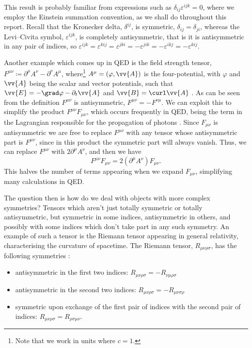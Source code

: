 \documentclass[fleqn]{NotesClass}
\begin{document}
    This result is probably familiar from expressions such as \(\delta_{ij}\varepsilon^{ijk} = 0\), where we employ the Einstein summation convention, as we shall do throughout this report.
    Recall that the Kronecker delta, \(\delta^{ij}\), is symmetric, \(\delta_{ij} = \delta_{ji}\), whereas the Levi--Civita symbol, \(\varepsilon^{ijk}\), is completely antisymmetric, that is it is antisymmetric in any pair of indices, so \(\varepsilon^{ijk} = \varepsilon^{kij} = \varepsilon^{jki} = -\varepsilon^{jik} = -\varepsilon^{ikj} = -\varepsilon^{kij}\).
    
    Another example which comes up in QED is the field strength tensor, \(F^{\mu\nu} \coloneqq \partial^\mu A^\nu - \partial^\nu A^\mu\), where\footnote{Note that we work in units where \(c = 1\).} \(A^\mu = (\varphi, \vv{A})\) is the four-potential, with \(\varphi\) and \(\vv{A}\) being the scalar and vector potentials, such that \(\vv{E} = -\grad\varphi - \partial_t\vv{A}\) and \(\vv{B} = \curl\vv{A}\) \cite[569]{griffiths}.
    As can be seen from the definition \(F^{\mu\nu}\) is antisymmetric, \(F^{\mu\nu} = -F^{\nu\mu}\).
    We can exploit this to simplify the product \(F^{\mu\nu}F_{\mu\nu}\), which occurs frequently in QED, being the term in the Lagrangian responsible for the propagation of photons \cite[294]{peskin}.
    Since \(F_{\mu\nu}\) is antisymmetric we are free to replace \(F^{\mu\nu}\) with any tensor whose antisymmetric part is \(F^{\mu\nu}\), since in this product the symmetric part will always vanish.
    Thus, we can replace \(F^{\mu\nu}\) with \(2\partial^\mu A^\nu\), and then we have
    \begin{equation}
        F^{\mu\nu}F_{\mu\nu} = 2(\partial^\mu A^\nu)F_{\mu\nu}.
    \end{equation}
    This halves the number of terms appearing when we expand \(F_{\mu\nu}\), simplifying many calculations in QED.
    
    The question then is how do we deal with objects with more complex symmetries?
    Tensors which aren't just totally symmetric or totally antisymmetric, but symmetric in some indices, antisymmetric in others, and possibly with some indices which don't take part in any such symmetry.
    An example of such a tensor is the Riemann tensor appearing in general relativity, characterising the curvature of spacetime.
    The Riemann tensor, \(R_{\mu\nu\rho\sigma}\), has the following symmetries \cite[141]{weinberg}:
    \begin{itemize}
        \item antisymmetric in the first two indices: \(R_{\mu\nu\rho\sigma} = -R_{\nu\mu\rho\sigma}\)
        \item antisymmetric in the second two indices: \(R_{\mu\nu\rho\sigma} = -R_{\mu\nu\sigma\rho}\)
        \item symmetric upon exchange of the first pair of indices with the second pair of indices: \(R_{\mu\nu\rho\sigma} = R_{\rho\sigma\mu\nu}\).
    \end{itemize}
    
\end{document}
